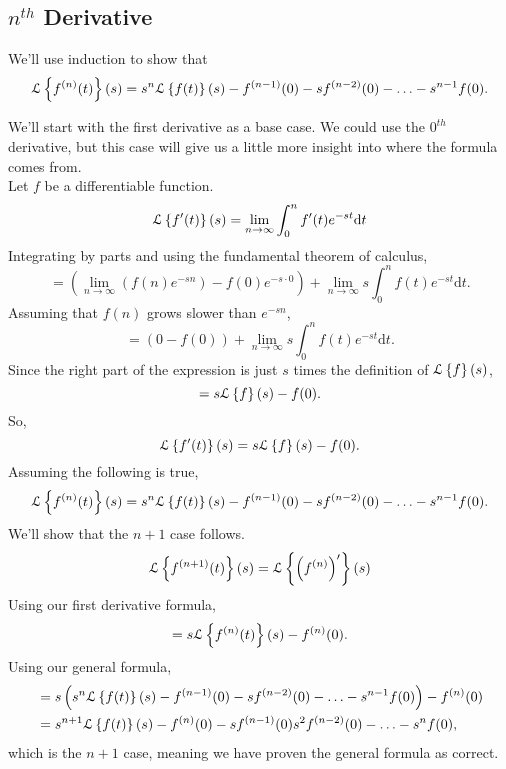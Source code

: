 \subsection{$n^{th}$ Derivative}
\noindent
We'll use induction to show that
\begin{equation*}
\mathcal{L}\left\{ f^{(n)}(t) \right\}\left(s\right) = s^n\mathcal{L}\left\{ f(t) \right\}\left(s\right) - f^{(n-1)}(0) - sf^{(n-2)}(0) - \ldots - s^{n-1}f(0).
\end{equation*}

\noindent
We'll start with the first derivative as a base case. We could use the $0^{th}$ derivative, but this case will give us a little more insight into where the formula comes from.\\
Let $f$ be a differentiable function.
\begin{equation*}
\mathcal{L}\left\{ f'(t) \right\}\left(s\right) = \lim\limits_{n\to\infty}{\int_{0}^{n}{f'(t)e^{-st}\mathrm{d}t}}
\end{equation*}
Integrating by parts and using the fundamental theorem of calculus,
\begin{equation*}
	 = \left(\lim\limits_{n\to\infty}{\left(f(n)e^{-sn}\right)} - f(0)e^{-s\cdot 0}\right) + \lim\limits_{n\to\infty}{s\int_{0}^{n}{f(t)e^{-st} \mathrm{d}t}}.
\end{equation*}
Assuming that $f(n)$ grows slower than $e^{-sn}$,
\begin{equation*}
	 = \left(0 - f(0)\right) + \lim\limits_{n\to\infty}{s\int_{0}^{n}{f(t)e^{-st} \mathrm{d}t}}.
\end{equation*}
Since the right part of the expression is just $s$ times the definition of $\mathcal{L}\left\{ f \right\}\left(s\right)$,
\begin{equation*}
	 = s\mathcal{L}\left\{ f \right\}\left(s\right) - f(0).
\end{equation*}
So,
\begin{equation*}
	\mathcal{L}\left\{ f'(t) \right\}\left(s\right) = s\mathcal{L}\left\{ f \right\}\left(s\right) - f(0).
\end{equation*}
Assuming the following is true,
\begin{equation*}
	\mathcal{L}\left\{ f^{(n)}(t) \right\}\left(s\right) = s^n\mathcal{L}\left\{ f(t) \right\}\left(s\right) - f^{(n-1)}(0) - sf^{(n-2)}(0) - \ldots - s^{n-1}f(0).
\end{equation*}
We'll show that the $n+1$ case follows.
\begin{equation*}
	\mathcal{L}\left\{ f^{(n+1)}(t) \right\}\left(s\right) = \mathcal{L}\left\{ \left(f^{(n)}\right)' \right\}\left(s\right)
\end{equation*}
Using our first derivative formula,
\begin{equation*}
	 = s\mathcal{L}\left\{ f^{(n)}(t) \right\}\left(s\right) - f^{(n)}(0).
\end{equation*}
Using our general formula,
\begin{align*}
	&= s \left(s^n\mathcal{L}\left\{ f(t) \right\}\left(s\right) - f^{(n-1)}(0) - sf^{(n-2)}(0) - \ldots - s^{n-1}f(0)\right) - f^{(n)}(0) \\
	&= s^{n+1}\mathcal{L}\left\{ f(t) \right\}\left(s\right) - f^{(n)}(0) - sf^{(n-1)}(0) s^2f^{(n-2)}(0) - \ldots - s^{n}f(0),
\end{align*}
which is the $n+1$ case, meaning we have proven the general formula as correct.